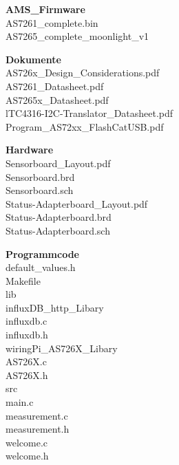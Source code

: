 \documentclass[a4paper,oneside,12pt,titlepage]{scrartcl}   %
\begin{document}
\noindent \textbf{AMS\_Firmware}\\
\indent AS7261\_complete.bin\\
\indent AS7265\_complete\_moonlight\_v1\smallskip

\noindent \textbf{Dokumente}\\
\indent AS726x\_Design\_Considerations.pdf\\
\indent AS7261\_Datasheet.pdf\\
\indent AS7265x\_Datasheet.pdf\\
\indent lTC4316-I2C-Translator\_Datasheet.pdf\\
\indent Program\_AS72xx\_FlashCatUSB.pdf\smallskip

\noindent \textbf{Hardware}\\
\indent Sensorboard\_Layout.pdf\\
\indent Sensorboard.brd\\
\indent Sensorboard.sch\\
\indent Status-Adapterboard\_Layout.pdf\\
\indent Status-Adapterboard.brd\\
\indent Status-Adapterboard.sch\smallskip

\noindent \textbf{Programmcode}\\
\indent default\_values.h\\
\indent Makefile\\
\indent lib\\
\indent \indent influxDB\_http\_Libary\\
\indent \indent \indent influxdb.c\\
\indent \indent \indent influxdb.h\\
\indent \indent wiringPi\_AS726X\_Libary\\
\indent \indent \indent AS726X.c\\
\indent \indent \indent AS726X.h\\
\indent src\\
\indent \indent main.c\\
\indent \indent measurement.c\\
\indent \indent measurement.h\\
\indent \indent welcome.c\\
\indent \indent welcome.h
\end{document}
